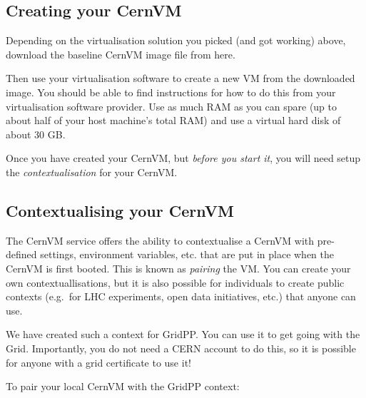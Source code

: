 \subsection{Creating your CernVM}
\label{creating-your-cernvm}
Depending on the virtualisation solution you picked (and got working)
above, download the baseline CernVM image file from here.

Then use your virtualisation software to create a new VM from the
downloaded image. You should be able to find instructions for how to do
this from your virtualisation software provider. Use as much RAM as you
can spare (up to about half of your host machine's total RAM) and use a
virtual hard disk of about 30 GB.

Once you have created your CernVM, but \emph{before you start it}, you
will need setup the \emph{contextualisation} for your CernVM.

\subsection{Contextualising your
CernVM}\label{contextualising-your-cernvm}

The CernVM service offers the ability to contextualise a CernVM with
pre-defined settings, environment variables, etc. that are put in place
when the CernVM is first booted. This is known as \emph{pairing} the VM.
You can create your own contextuallisations, but it is also possible for
individuals to create public contexts (e.g.~for LHC experiments, open
data initiatives, etc.) that anyone can use.

We have created such a context for GridPP. You can use it to get going
with the Grid. Importantly, you do not need a CERN account to do this,
so it is possible for anyone with a grid certificate to use it!

To pair your local CernVM with the GridPP context:

